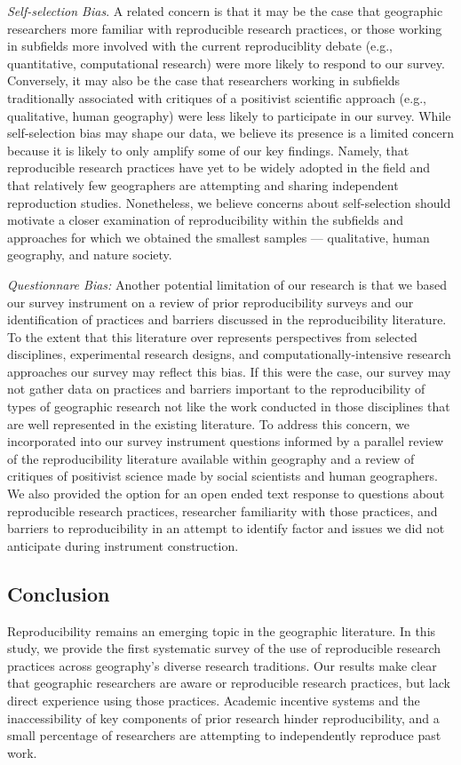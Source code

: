 \documentclass[]{interact}
\theoremstyle{plain}%
\theoremstyle{definition}
\theoremstyle{remark}
\begin{document}
\textit{Self-selection Bias}. A related concern is that it may be the case that geographic researchers more familiar with reproducible research practices, or those working in subfields more involved with the current reproduciblity debate (e.g., quantitative, computational research) were more likely to respond to our survey. 
Conversely, it may also be the case that researchers working in subfields traditionally associated with critiques of a positivist scientific approach (e.g., qualitative, human geography) were less likely to participate in our survey. 
While self-selection bias may shape our data, we believe its presence is a limited concern because it is likely to only amplify some of our key findings. 
Namely, that reproducible research practices have yet to be widely adopted in the field and that relatively few geographers are attempting and sharing independent reproduction studies.
Nonetheless, we believe concerns about self-selection should motivate a closer examination of reproducibility within the subfields and approaches for which we obtained the smallest samples --- qualitative, human geography, and nature society.  

\textit{Questionnare Bias:} Another potential limitation of our research is that we based our survey instrument on a review of prior reproducibility surveys and our identification of practices and barriers discussed in the reproducibility literature. 
To the extent that this literature over represents perspectives from selected disciplines, experimental research designs, and computationally-intensive research approaches our survey may reflect this bias. 
If this were the case, our survey may not gather data on practices and barriers important to the reproducibility of types of geographic research not like the work conducted in those disciplines that are well represented in the existing literature. 
To address this concern, we incorporated into our survey instrument questions informed by a parallel review of the reproducibility literature available within geography and a review of critiques of positivist science made by social scientists and human geographers.
We also provided the option for an open ended text response to questions about reproducible research practices, researcher familiarity with those practices, and barriers to reproducibility in an attempt to identify factor and issues we did not anticipate during instrument construction.  


\subsection*{Conclusion}
Reproducibility remains an emerging topic in the geographic literature. 
In this study, we provide the first systematic survey of the use of reproducible research practices across geography's diverse research traditions. 
Our results make clear that geographic researchers are aware or reproducible research practices, but lack direct experience using those practices.
Academic incentive systems and the inaccessibility of key components of prior research hinder reproducibility, and a small percentage of researchers are attempting to independently reproduce past work.  
\end{document}
